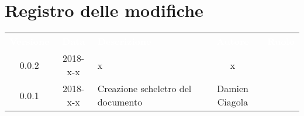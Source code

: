 \section*{Registro delle modifiche}
{
	\renewcommand{\arraystretch}{1.5}
	\centering
	\begin{longtable}{ c c C{4cm} c c }
		\textcolor{white}{\textbf{Versione}} & \textcolor{white}{\textbf{Data}} & \textcolor{white}{\textbf{Descrizione}} & \textcolor{white}{\textbf{Autore}} & \textcolor{white}{\textbf{Ruolo}}\\
		0.0.2 & 2018-x-x & x & x & \ana{} \\
		0.0.1 & 2018-x-x & Creazione scheletro del documento & Damien Ciagola & \ana{}\\
	\end{longtable}

}